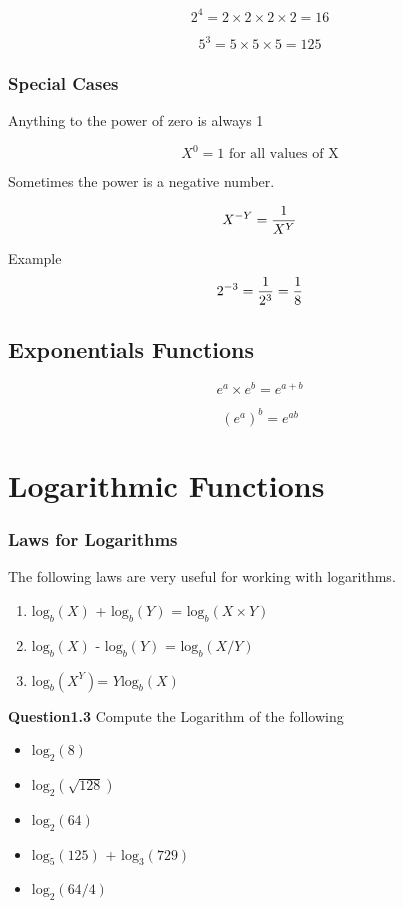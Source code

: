 \documentclass[]{report}
\begin{document}
\[  2^ 4 = 2 \times 2 \times 2 \times 2 = 16 \]

\[  5^ 3 = 5 \times 5 \times 5 =125 \]

\subsubsection{Special Cases}

Anything to the power of zero is always 1

\[  X^ 0 = 1 \mbox{ for all values of X} \]

Sometimes the power is a negative number.

\[  X^{-Y} = { 1 \over X^Y}  \]

Example 
\[  2^{-3} = { 1 \over 2^3} = { 1 \over 8}  \]



\subsection{Exponentials Functions}

\[ e^a \times e^b = e^{a+b}\]

\[ (e^a )^b = e^{ab}\]


\section{Logarithmic Functions}

\subsubsection{Laws for Logarithms}
The following laws are very useful for working with logarithms.
\begin{enumerate}
\item $\mbox{log}_b(X)$ + $\mbox{log}_b(Y)$ = $\mbox{log}_b(X\times Y)$
\item $\mbox{log}_b(X)$ - $\mbox{log}_b(Y)$ = $\mbox{log}_b(X / Y)$
\item $\mbox{log}_b(X^Y)$= $Y \mbox{log}_b(X)$
\end{enumerate}

\noindent \textbf{Question1.3} Compute the Logarithm of the following
\begin{itemize}
\item $\mbox{log}_2(8)$
\item $\mbox{log}_2(\sqrt{128})$
\item $\mbox{log}_2(64)$
\item $\mbox{log}_5(125)$ +   $\mbox{log}_3(729)$
\item $\mbox{log}_2(64/4)$
\end{itemize}
\end{document}
